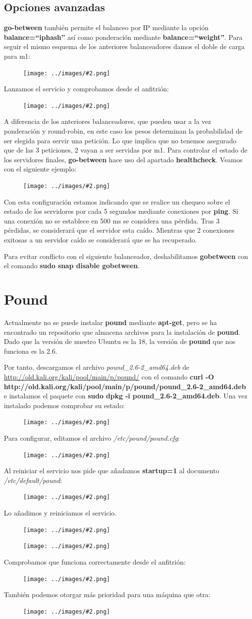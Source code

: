 \documentclass[twoside]{article}
\newcommand{\enquote}[1]{``#1''}
\newcommand{\image}[2]{
\begin{figure}[H]
    \texttt{[image: ../images/\#2.png]}
    \centering
\end{figure}
}
\begin{document}
\subsection{Opciones avanzadas}
\textbf{go-between} también permite el balanceo por IP mediante la opción \textbf{balance=\enquote{iphash}} así como ponderación mediante \textbf{balance=\enquote{weight}}. Para seguir el mismo esquema de los anteriores balanceadores damos el doble de carga para m1:
\image{6}{35}
Lanzamos el servicio y comprobamos desde el anfitrión:
\image{8}{36}
A diferencia de los anteriores balanceadores, que pueden usar a la vez ponderación y round-robin, en este caso los pesos determinan la probabilidad de ser elegida para servir una petición. Lo que implica que no tenemos asegurado que de las 3 peticiones, 2 vayan a ser servidas por m1.
Para controlar el estado de los servidores finales, \textbf{go-between} hace uso del apartado \textbf{healthcheck}. Veamos con el siguiente ejemplo:
\image{6}{37}
Con esta configuración estamos indicando que se realice un chequeo sobre el estado de los servidores por cada 5 segundos mediante conexiones por \textbf{ping}. Si una conexión no se establece en 500 ms se considera una pérdida. Tras 3 pérdidas, se considerará que el servidor esta caído. Mientras que 2 conexiones exitosas a un servidor caído se considerará que se ha recuperado.  

Para evitar conflicto con el siguiente balanceador, deshabilitamos \textbf{gobetween} con el comando \textbf{sudo snap disable gobetween}.

\section{Pound}
Actualmente no se puede instalar \textbf{pound} mediante \textbf{apt-get}, pero se ha encontrado un repositorio que almacena archivos para la instalación de \textbf{pound}. Dado que la versión de nuestro Ubuntu es la 18, la versión de \textbf{pound} que nos funciona es la 2.6.

Por tanto, descargamos el archivo \textit{pound\_2.6-2\_amd64.deb} de \url{http://old.kali.org/kali/pool/main/p/pound/} con el comando \textbf{curl -O http://old.kali.org/kali/pool/main/p/pound/pound\_2.6-2\_amd64.deb} e instalamos el paquete con \textbf{sudo dpkg -i pound\_2.6-2\_amd64.deb}. Una vez instalado podemos comprobar su estado:
\image{8}{38}
Para configurar, editamos el archivo \textit{/etc/pound/pound.cfg}:
\image{8}{39}
Al reiniciar el servicio nos pide que añadamos \textbf{startup=1} al documento \textit{/etc/default/pound}:
\image{8}{40}
Lo añadimos y reiniciamos el servicio.
\image{8}{41}
\image{8}{42}
Comprobamos que funciona correctamente desde el anfitrión:
\image{8}{43}
También podemos otorgar más prioridad para una máquina que otra:
\image{8}{44}
\end{document}
